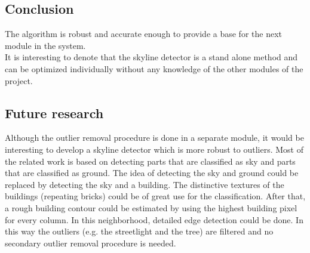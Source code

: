 \subsection{Conclusion}
 The algorithm 
is robust and
accurate enough to provide a base for the next module in the system.\\

It is interesting to denote that the skyline detector is a stand alone method and
can be optimized individually without any knowledge of the other modules of the
project.\\


\subsection{Future research}
Although the outlier removal procedure is done in a separate module, it would be
interesting to develop a skyline detector which is more robust to
outliers.  Most of the related work is based on detecting parts that are
classified as sky and parts that are classified as ground. The idea of detecting
the sky and ground could be replaced by detecting the sky and a building. The
distinctive textures of the buildings (repeating bricks) could be of great use
for the classification.  After that, a rough building contour could be estimated
	by using the highest building pixel for every column. In this neighborhood,
	detailed edge detection could be done. In this way the outliers (e.g. the
	streetlight and the tree) are filtered and no secondary outlier removal
	procedure is needed.




